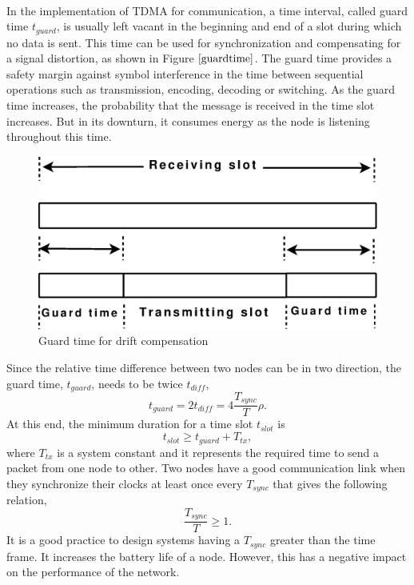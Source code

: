 \documentclass[a4paper,10pt]{report}
\begin{document}
\paragraph*{}
In the implementation of TDMA for communication, a time interval,
called guard time $t_{guard}$, is usually left vacant in the
beginning and end of a slot during which no data is sent. This time
can be used for synchronization and compensating for a signal
distortion, as shown in Figure $\ref{guardtime}$. The guard time
provides a safety margin against symbol interference in the time
between sequential operations such as transmission, encoding,
decoding or switching. As the guard time increases, the probability
that the message is received in the time slot increases. But in its
downturn, it consumes energy as the node is listening throughout
this time.
\begin{figure}
\centering
\includegraphics[width=0.5 \textwidth]{guardtime}
\caption{Guard time for drift compensation} \label{guardtime}
\end{figure}
Since the relative time difference between two nodes can be in two
direction, the guard time,
$t_{guard}$,
needs to be twice $t_{diff}$,
\begin{equation}
t_{guard}= 2t_{diff} = 4\dfrac{T_{sync}}{T}\rho.
\end{equation}
At this end, the minimum duration for a time slot $t_{slot}$ is
\begin{equation}
t_{slot} \geq t_{guard} + T_{tx},
\end{equation}
where $T_{tx}$ is a system constant and it represents the required
time to send a packet from one node to other. Two nodes have a good
communication link when they synchronize their clocks at least once
every $T_{sync}$ that gives the following relation,
\begin{equation}
\dfrac{T_{sync}}{T}\geq 1.
\end{equation}
It is a good practice to design systems having a $T_{sync}$ greater
than the time frame. It increases the battery life of a node.
However, this has a negative impact on the performance of the
network.
\end{document}
